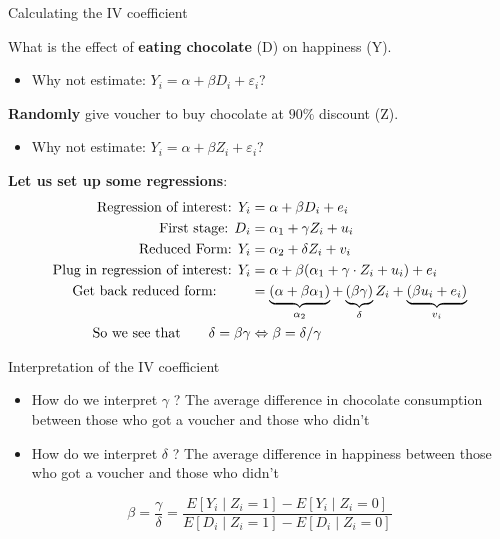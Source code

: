\documentclass[11pt,xcolor=table]{beamer}
\begin{document}
\begin{frame}{Calculating the IV coefficient}
    
What is the effect of \textbf{eating chocolate} (D) on happiness (Y).
\begin{itemize}
    \item Why not estimate: $Y_i = \alpha + \beta D_i + \varepsilon_i$?
\end{itemize}
\textbf{Randomly} give voucher to buy chocolate at $90 \%$ discount (Z).

\begin{itemize}
    \item Why not estimate: $Y_i = \alpha + \beta Z_i + \varepsilon_i$?
\end{itemize}
\textbf{Let us set up some regressions}:
\begin{align*}
\text{Regression of interest: }  Y_i&=\alpha+\beta  D_i +  e_i \\
\text{First stage: }  D_i&=\alpha_1+\gamma  Z_i + u_i \\
\text{Reduced Form: }  Y_i&=\alpha_2+\delta  Z_i + v_i \\
\text{Plug in regression of interest: }  Y_i &= \alpha + \beta (\alpha_1+\gamma \cdot Z_i + u_i) + e_i   \\ 
\text{Get back reduced form: \qquad }& = \underbrace{(\alpha + \beta \alpha_1)}_{\alpha_2} + \underbrace{(\beta \gamma)}_{\delta} Z_i + \underbrace{(\beta u_i + e_i)}_{v_i}  \\
 \text{So we see that} \qquad    \delta = \beta \gamma &\Leftrightarrow \beta = \delta / \gamma
\end{align*}





\end{frame}



\begin{frame}{Interpretation of the IV coefficient}
\begin{itemize}
\item How do we interpret $\gamma$ ? \pause The average difference in chocolate consumption between those who got a voucher and those who didn't \pause 
\item How do we interpret $\delta$ ? \pause The average difference in happiness between those who got a voucher and those who didn't \pause 
\end{itemize}
$$
\beta=\frac{\gamma}{\delta}=\frac{E\left[Y_i \mid Z_i=1\right]-E\left[Y_i \mid Z_i=0\right]}{E\left[D_i \mid Z_i=1\right]-E\left[D_i \mid Z_i=0\right]}
$$


\end{frame}
\end{document}

